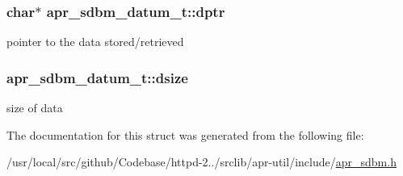 \subsubsection[{\texorpdfstring{dptr}{dptr}}]{\setlength{\rightskip}{0pt plus 5cm}char$\ast$ apr\+\_\+sdbm\+\_\+datum\+\_\+t\+::dptr}\hypertarget{structapr__sdbm__datum__t_a927c668d3912a4cc8466b0f551d00169}{}\label{structapr__sdbm__datum__t_a927c668d3912a4cc8466b0f551d00169}
pointer to the data stored/retrieved 
\subsubsection[{\texorpdfstring{dsize}{dsize}}]{ apr\+\_\+sdbm\+\_\+datum\+\_\+t\+::dsize}\hypertarget{structapr__sdbm__datum__t_aedbd0295ba540695d5b407f1dec90eb5}{}\label{structapr__sdbm__datum__t_aedbd0295ba540695d5b407f1dec90eb5}
size of data 

The documentation for this struct was generated from the following file\+:\begin{DoxyCompactItemize}
\item 
/usr/local/src/github/\+Codebase/httpd-\/2../srclib/apr-\/util/include/\hyperlink{apr__sdbm_8h}{apr\+\_\+sdbm.\+h}\end{DoxyCompactItemize}
